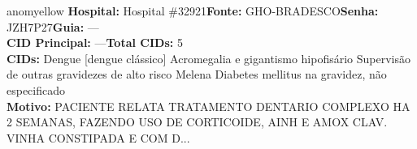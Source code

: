 \documentclass[a4paper,10pt]{article}
\begin{document}
\begin{anomalycard}[Interna\c{c}\~{a}o \#118154 | Pac. \#98041 | MODERADO (z=2.50) | LOS: 4d | 22/02/2026\,$\to$\,26/02/2026]{anomyellow}
\textbf{Hospital:} Hospital \#32921\quad \textbf{Fonte:} GHO-BRADESCO\quad \textbf{Senha:} JZH7P27\quad \textbf{Guia:} ---\\

\textbf{CID Principal:} {\small ---}\quad\textbf{Total CIDs:} 5\\

\textbf{CIDs:} {\scriptsize Dengue [dengue clássico] \textbar{} Acromegalia e gigantismo hipofisário \textbar{} Supervisão de outras gravidezes de alto risco \textbar{} Melena \textbar{} Diabetes mellitus na gravidez, não especificado}\\

\textbf{Motivo:} {\scriptsize PACIENTE RELATA TRATAMENTO DENTARIO COMPLEXO HA 2 SEMANAS,  FAZENDO USO DE CORTICOIDE,  AINH E AMOX CLAV. VINHA CONSTIPADA E COM D...}\\




\end{anomalycard}
\end{document}
